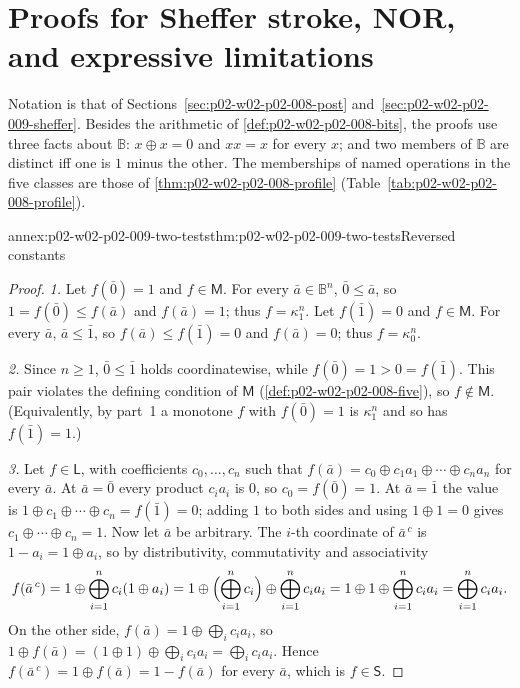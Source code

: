 \section{Proofs for Sheffer stroke, NOR, and expressive limitations}
\label{sec:annex-p02-w02-p02-009-sheffer}

Notation is that of Sections~\ref{sec:p02-w02-p02-008-post}
and~\ref{sec:p02-w02-p02-009-sheffer}.  Besides the arithmetic of
\cref{def:p02-w02-p02-008-bits}, the proofs use three facts about
\(\mathbb B\): \(x\oplus x=0\) and \(xx=x\) for every \(x\); and two members
of \(\mathbb B\) are distinct iff one is \(1\) minus the other.  The
memberships of named operations in the five classes are those of
\cref{thm:p02-w02-p02-008-profile} (Table~\ref{tab:p02-w02-p02-008-profile}).

\begin{annexitem}{annex:p02-w02-p02-009-two-tests}{thm:p02-w02-p02-009-two-tests}{Reversed constants}
\begin{proof}
\emph{1.}  Let \(f(\bar0)=1\) and \(f\in\mathsf M\).  For every
\(\bar a\in\mathbb B^n\), \(\bar0\leq\bar a\), so
\(1=f(\bar0)\leq f(\bar a)\) and \(f(\bar a)=1\); thus \(f=\kappa^n_1\).
Let \(f(\bar1)=0\) and \(f\in\mathsf M\).  For every \(\bar a\),
\(\bar a\leq\bar1\), so \(f(\bar a)\leq f(\bar1)=0\) and \(f(\bar a)=0\);
thus \(f=\kappa^n_0\).

\emph{2.}  Since \(n\geq1\), \(\bar0\leq\bar1\) holds coordinatewise, while
\(f(\bar0)=1>0=f(\bar1)\).  This pair violates the defining condition of
\(\mathsf M\) (\cref{def:p02-w02-p02-008-five}), so \(f\notin\mathsf M\).
(Equivalently, by part~1 a monotone \(f\) with \(f(\bar0)=1\) is
\(\kappa^n_1\) and so has \(f(\bar1)=1\).)

\emph{3.}  Let \(f\in\mathsf L\), with coefficients \(c_0,\ldots,c_n\) such
that \(f(\bar a)=c_0\oplus c_1a_1\oplus\cdots\oplus c_na_n\) for every
\(\bar a\).  At \(\bar a=\bar0\) every product \(c_ia_i\) is \(0\), so
\(c_0=f(\bar0)=1\).  At \(\bar a=\bar1\) the value is
\(1\oplus c_1\oplus\cdots\oplus c_n=f(\bar1)=0\); adding \(1\) to both sides
and using \(1\oplus1=0\) gives \(c_1\oplus\cdots\oplus c_n=1\).  Now let
\(\bar a\) be arbitrary.  The \(i\)-th coordinate of \(\bar a^{\,c}\) is
\(1-a_i=1\oplus a_i\), so by distributivity, commutativity and associativity
\[
 f(\bar a^{\,c})
 =1\oplus\bigoplus_{i=1}^n c_i(1\oplus a_i)
 =1\oplus\Bigl(\bigoplus_{i=1}^n c_i\Bigr)\oplus\bigoplus_{i=1}^n c_ia_i
 =1\oplus1\oplus\bigoplus_{i=1}^n c_ia_i
 =\bigoplus_{i=1}^n c_ia_i .
\]
On the other side, \(f(\bar a)=1\oplus\bigoplus_i c_ia_i\), so
\(1\oplus f(\bar a)=(1\oplus1)\oplus\bigoplus_i c_ia_i=\bigoplus_i c_ia_i\).
Hence \(f(\bar a^{\,c})=1\oplus f(\bar a)=1-f(\bar a)\) for every
\(\bar a\), which is \(f\in\mathsf S\).
\end{proof}
\end{annexitem}

